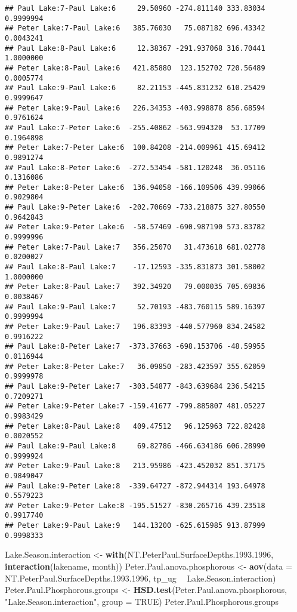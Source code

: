 \documentclass[]{article}
\newenvironment{Shaded}{\begin{snugshade}}{\end{snugshade}}
\newcommand{\DataTypeTok}[1]{\textcolor[rgb]{0.13,0.29,0.53}{#1}}
\newcommand{\FloatTok}[1]{\textcolor[rgb]{0.00,0.00,0.81}{#1}}
\newcommand{\KeywordTok}[1]{\textcolor[rgb]{0.13,0.29,0.53}{\textbf{#1}}}
\newcommand{\NormalTok}[1]{#1}
\newcommand{\OperatorTok}[1]{\textcolor[rgb]{0.81,0.36,0.00}{\textbf{#1}}}
\newcommand{\OtherTok}[1]{\textcolor[rgb]{0.56,0.35,0.01}{#1}}
\newcommand{\StringTok}[1]{\textcolor[rgb]{0.31,0.60,0.02}{#1}}
\begin{document}
\begin{verbatim}
## Paul Lake:7-Paul Lake:6     29.50960 -274.811140 333.83034 0.9999994
## Peter Lake:7-Paul Lake:6   385.76030   75.087182 696.43342 0.0043241
## Paul Lake:8-Paul Lake:6     12.38367 -291.937068 316.70441 1.0000000
## Peter Lake:8-Paul Lake:6   421.85880  123.152702 720.56489 0.0005774
## Paul Lake:9-Paul Lake:6     82.21153 -445.831232 610.25429 0.9999647
## Peter Lake:9-Paul Lake:6   226.34353 -403.998878 856.68594 0.9761624
## Paul Lake:7-Peter Lake:6  -255.40862 -563.994320  53.17709 0.1964898
## Peter Lake:7-Peter Lake:6  100.84208 -214.009961 415.69412 0.9891274
## Paul Lake:8-Peter Lake:6  -272.53454 -581.120248  36.05116 0.1316086
## Peter Lake:8-Peter Lake:6  136.94058 -166.109506 439.99066 0.9029804
## Paul Lake:9-Peter Lake:6  -202.70669 -733.218875 327.80550 0.9642843
## Peter Lake:9-Peter Lake:6  -58.57469 -690.987190 573.83782 0.9999996
## Peter Lake:7-Paul Lake:7   356.25070   31.473618 681.02778 0.0200027
## Paul Lake:8-Paul Lake:7    -17.12593 -335.831873 301.58002 1.0000000
## Peter Lake:8-Paul Lake:7   392.34920   79.000035 705.69836 0.0038467
## Paul Lake:9-Paul Lake:7     52.70193 -483.760115 589.16397 0.9999994
## Peter Lake:9-Paul Lake:7   196.83393 -440.577960 834.24582 0.9916222
## Paul Lake:8-Peter Lake:7  -373.37663 -698.153706 -48.59955 0.0116944
## Peter Lake:8-Peter Lake:7   36.09850 -283.423597 355.62059 0.9999978
## Paul Lake:9-Peter Lake:7  -303.54877 -843.639684 236.54215 0.7209271
## Peter Lake:9-Peter Lake:7 -159.41677 -799.885807 481.05227 0.9983429
## Peter Lake:8-Paul Lake:8   409.47512   96.125963 722.82428 0.0020552
## Paul Lake:9-Paul Lake:8     69.82786 -466.634186 606.28990 0.9999924
## Peter Lake:9-Paul Lake:8   213.95986 -423.452032 851.37175 0.9849047
## Paul Lake:9-Peter Lake:8  -339.64727 -872.944314 193.64978 0.5579223
## Peter Lake:9-Peter Lake:8 -195.51527 -830.265716 439.23518 0.9917740
## Peter Lake:9-Paul Lake:9   144.13200 -625.615985 913.87999 0.9998333
\end{verbatim}

\begin{Shaded}
\begin{Highlighting}[]
\NormalTok{Lake.Season.interaction <-}\StringTok{ }\KeywordTok{with}\NormalTok{(NT.PeterPaul.SurfaceDepths.}\FloatTok{1993.1996}\NormalTok{, }\KeywordTok{interaction}\NormalTok{(lakename, month))}
\NormalTok{Peter.Paul.anova.phosphorous <-}\StringTok{ }\KeywordTok{aov}\NormalTok{(}\DataTypeTok{data =}\NormalTok{ NT.PeterPaul.SurfaceDepths.}\FloatTok{1993.1996}\NormalTok{, tp_ug }\OperatorTok{~}\StringTok{ }\NormalTok{Lake.Season.interaction)}
\NormalTok{Peter.Paul.Phosphorous.groups <-}\StringTok{ }\KeywordTok{HSD.test}\NormalTok{(Peter.Paul.anova.phosphorous, }\StringTok{"Lake.Season.interaction"}\NormalTok{, }\DataTypeTok{group =} \OtherTok{TRUE}\NormalTok{)}
\NormalTok{Peter.Paul.Phosphorous.groups}
\end{Highlighting}
\end{Shaded}
\end{document}
